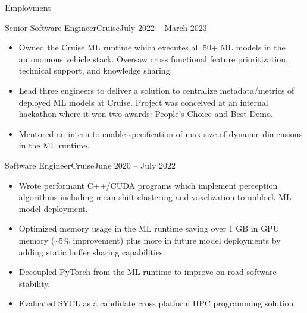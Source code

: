 \documentclass[termes]{resume}
\begin{document}
	\begin{cvsection}{Employment}
		\begin{cvsubsection}{Senior Software Engineer}{Cruise}{July 2022 -- March 2023}		
			\begin{itemize}
				\item Owned the Cruise ML runtime which executes all 50+ ML models in the autonomous vehicle stack. Oversaw cross functional feature prioritization, technical support, and knowledge sharing.
				\item Lead three engineers to deliver a solution to centralize metadata/metrics of deployed ML models at Cruise. Project was conceived at an internal hackathon where it won two awards: People's Choice and Best Demo.
				\item Mentored an intern to enable specification of max size of dynamic dimensions in the ML runtime.
			\end{itemize}
		\end{cvsubsection}
		
		\begin{cvsubsection}{Software Engineer}{Cruise}{June 2020 -- July 2022}		
			\begin{itemize}
				\item Wrote performant C++/CUDA programs which implement perception algorithms including mean shift clustering and voxelization to unblock ML model deployment.
				\item Optimized memory usage in the ML runtime saving over 1 GB in GPU memory (\sim5\% improvement) plus more in future model deployments by adding static buffer sharing capabilities.
 				\item Decoupled PyTorch from the ML runtime to improve on road software stability.
				\item Evaluated SYCL as a candidate cross platform HPC programming solution.
			\end{itemize}
		\end{cvsubsection}
		

\end{cvsection}
\end{document}
